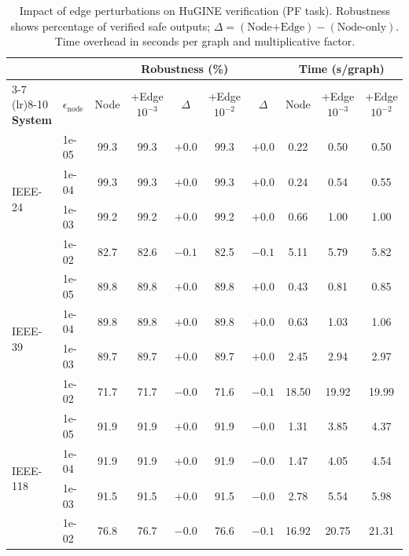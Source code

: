 \begin{table}[t]
\centering
\caption{Impact of edge perturbations on HuGINE verification (PF task). Robustness shows percentage of verified safe outputs; $\Delta = (\text{Node{+}Edge}) - (\text{Node-only})$. Time overhead in seconds per graph and multiplicative factor.}
\label{tab:hugine_edge}
\setlength{\tabcolsep}{4pt}
\begin{tabular}{l l c c c c c c c c}
\toprule
& & \multicolumn{5}{c}{Robustness (\%)} & \multicolumn{3}{c}{Time (s/graph)} \\
\cmidrule(lr){3-7} \cmidrule(lr){8-10}
\textbf{System} & $\epsilon_{\mathrm{node}}$ & Node & +Edge $10^{-3}$ & $\Delta$ & +Edge $10^{-2}$ & $\Delta$ & Node & +Edge $10^{-3}$ & +Edge $10^{-2}$ \\
\midrule
\multirow{4}{*}{IEEE-24} & 1e-05 & 99.3 & 99.3 & $+0.0$ & 99.3 & $+0.0$ & 0.22 & 0.50 & 0.50 \\
 & 1e-04 & 99.3 & 99.3 & $+0.0$ & 99.3 & $+0.0$ & 0.24 & 0.54 & 0.55 \\
 & 1e-03 & 99.2 & 99.2 & $+0.0$ & 99.2 & $+0.0$ & 0.66 & 1.00 & 1.00 \\
 & 1e-02 & 82.7 & 82.6 & $-0.1$ & 82.5 & $-0.1$ & 5.11 & 5.79 & 5.82 \\
\midrule
\multirow{4}{*}{IEEE-39} & 1e-05 & 89.8 & 89.8 & $+0.0$ & 89.8 & $+0.0$ & 0.43 & 0.81 & 0.85 \\
 & 1e-04 & 89.8 & 89.8 & $+0.0$ & 89.8 & $+0.0$ & 0.63 & 1.03 & 1.06 \\
 & 1e-03 & 89.7 & 89.7 & $+0.0$ & 89.7 & $+0.0$ & 2.45 & 2.94 & 2.97 \\
 & 1e-02 & 71.7 & 71.7 & $-0.0$ & 71.6 & $-0.1$ & 18.50 & 19.92 & 19.99 \\
\midrule
\multirow{4}{*}{IEEE-118} & 1e-05 & 91.9 & 91.9 & $+0.0$ & 91.9 & $-0.0$ & 1.31 & 3.85 & 4.37 \\
 & 1e-04 & 91.9 & 91.9 & $+0.0$ & 91.9 & $-0.0$ & 1.47 & 4.05 & 4.54 \\
 & 1e-03 & 91.5 & 91.5 & $+0.0$ & 91.5 & $-0.0$ & 2.78 & 5.54 & 5.98 \\
 & 1e-02 & 76.8 & 76.7 & $-0.0$ & 76.6 & $-0.1$ & 16.92 & 20.75 & 21.31 \\
\bottomrule
\end{tabular}
\end{table}
